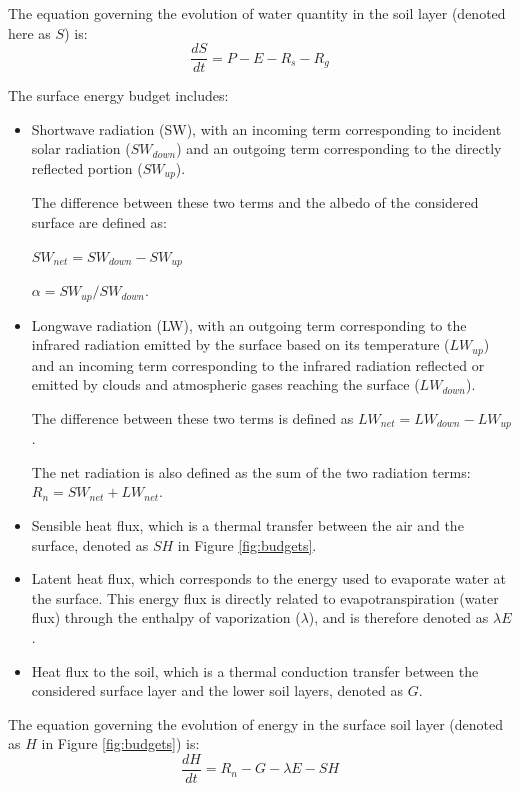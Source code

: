 The equation governing the evolution of water quantity in the soil layer (denoted here as $S$) is:
\begin{equation}
    \frac{dS}{dt} = P - E - R_s - R_g
\end{equation}

The surface energy budget includes:
\begin{itemize}
    \item Shortwave radiation (SW), with an incoming term corresponding to incident solar radiation ($SW_{down}$) and an outgoing term corresponding to the directly reflected portion ($SW_{up}$).

    The difference between these two terms and the albedo of the considered surface are defined as:

    $SW_{net} = SW_{down} - SW_{up}$

    $\alpha = SW_{up}/SW_{down}$.
    \item Longwave radiation (LW), with an outgoing term corresponding to the infrared radiation emitted by the surface based on its temperature ($LW_{up}$) and an incoming term corresponding to the infrared radiation reflected or emitted by clouds and atmospheric gases reaching the surface ($LW_{down}$).

    The difference between these two terms is defined as $LW_{net} = LW_{down} - LW_{up}$.

    The net radiation is also defined as the sum of the two radiation terms: $R_{n} = SW_{net} + LW_{net}$.
    \item Sensible heat flux, which is a thermal transfer between the air and the surface, denoted as $SH$ in Figure \ref{fig:budgets}.
    \item Latent heat flux, which corresponds to the energy used to evaporate water at the surface. This energy flux is directly related to evapotranspiration (water flux) through the enthalpy of vaporization ($\lambda$), and is therefore denoted as $\lambda E$.
    \item Heat flux to the soil, which is a thermal conduction transfer between the considered surface layer and the lower soil layers, denoted as $G$.
\end{itemize}

The equation governing the evolution of energy in the surface soil layer (denoted as $H$ in Figure \ref{fig:budgets}) is:
\begin{equation}
    \frac{dH}{dt} = R_{n} - G - \lambda E - SH
\end{equation}

